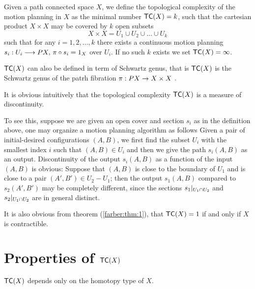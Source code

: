 \begin{defn}
    Given a path connected space $X$, we define the topological complexity of the motion planning in $X$ as the minimal number $\textsf{TC}(X) = k$, such that the cartesian product $X \times X$ may be covered by $k$ open subsets
    \[
        X \times X  = U_1 \cup U_2 \cup \dots \cup U_k
    \]
    such that for any $i = 1,2, \ldots, k$ there exists a continuous motion planning $s_i: U_i \longrightarrow PX, \, \pi \circ s_i = 1_X$ over $U_i$. If no such $k$ exists we set $\textsf{TC}(X) = \infty$.
\end{defn}

\begin{rem}
    $\textsf{TC}(X)$ can also be defined in term of Schwartz genus, that is $\textsf{TC}(X)$ is the Schwartz genus of the patrh fibration $\pi : PX \rightarrow X \times X$ \cite{farber2007symmetric}.

    It is obvious intuitively that the topological complexity $\textsf{TC}(X)$ is a measure of discontinuity.

    To see this, suppose we are given an open cover and section $s_i$ as in the definition above, one may organize a motion planning algorithm as follows Given a pair of initial-desired configurations
    $(A, B)$, we first find the subset $U_i$ with the smallest index $i$ such that $(A,B) \in U_i$ and then we give the path $s_i(A,B)$ as an output. Discontinuity of the output $s_i(A,B)$ as a function of the input $(A,B)$ is obvious: Suppose that $(A,B)$ is close to the boundary of $U_1$ and is close to a pair $(A', B') \in U_2 - U_1$; then the output $s_1(A,B)$ compared to $s_2(A',B')$ may be completely different, since the sections $\displaystyle s_1|_{U_1 \cap U_2}$ and $\displaystyle s_2|_{U_1 \cap U_2}$ are in general distinct.

    It is also obvious from theorem (\ref{farber:thm:1}), that $\textsf{TC}(X) = 1$ if and only if $X$ is contractible.
\end{rem}

\section{Properties of $\textsf{TC}(X)$}

\begin{thm}\label{homtopy:invariance}
    $\textsf{TC}(X)$ depends only on the homotopy type of $X$.
\end{thm}


